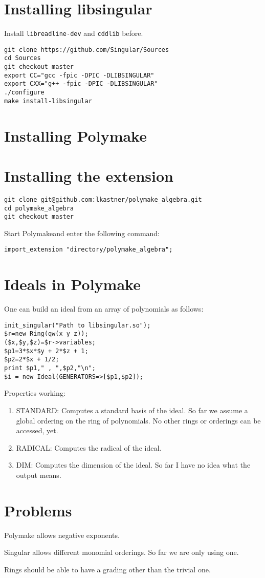 \documentclass[a4paper]{article}
\newcommand{\PM}{Polymake}
\begin{document}
\section{Installing libsingular}
Install {\tt libreadline-dev} and {\tt cddlib} before.
\begin{verbatim}
git clone https://github.com/Singular/Sources
cd Sources
git checkout master
export CC="gcc -fpic -DPIC -DLIBSINGULAR"
export CXX="g++ -fpic -DPIC -DLIBSINGULAR"
./configure
make install-libsingular
\end{verbatim}
\section{Installing Polymake}

\section{Installing the extension}

\begin{verbatim}
git clone git@github.com:lkastner/polymake_algebra.git
cd polymake_algebra
git checkout master
\end{verbatim}

Start \PM and enter the following command:
\begin{verbatim}
import_extension "directory/polymake_algebra";
\end{verbatim}
\section{Ideals in Polymake}
One can build an ideal from an array of polynomials as follows:
\begin{verbatim}
init_singular("Path to libsingular.so");
$r=new Ring(qw(x y z));
($x,$y,$z)=$r->variables;
$p1=3*$x*$y + 2*$z + 1;
$p2=2*$x + 1/2;
print $p1," , ",$p2,"\n";
$i = new Ideal(GENERATORS=>[$p1,$p2]);
\end{verbatim}
Properties working:
\begin{enumerate}
\item STANDARD: Computes a standard basis of the ideal. So far we assume a global ordering on the ring of polynomials. No other rings or orderings can be accessed, yet.
\item RADICAL: Computes the radical of the ideal.
\item DIM: Computes the dimension of the ideal. So far I have no idea what the output means.
\end{enumerate}
\section{Problems}
Polymake allows negative exponents.

Singular allows different monomial orderings. So far we are only using one.

Rings should be able to have a grading other than the trivial one.
\end{document}
